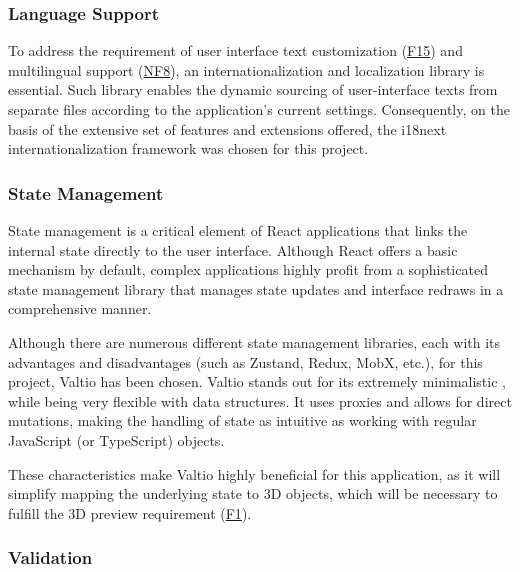 \subsubsection{Language Support} \label{section:i18n}

To address the requirement of user interface text customization (\hyperref[itm:F15]{F15}) and multilingual support (\hyperref[itm:NF8]{NF8}), an internationalization and localization library is essential. Such library enables the dynamic sourcing of user-interface texts from separate files according to the application's current settings. Consequently, on the basis of the extensive set of features and extensions offered, the i18next internationalization framework was chosen for this project.~\cite{Krukowski2023}

\subsubsection{State Management}

State management is a critical element of React applications that links the internal state directly to the user interface. Although React offers a basic mechanism by default, complex applications highly profit from a sophisticated state management library that manages state updates and interface redraws in a comprehensive manner.~\cite{Ceddia2021}

Although there are numerous different state management libraries, each with its advantages and disadvantages (such as Zustand, Redux, MobX, etc.), for this project, Valtio has been chosen. Valtio stands out for its extremely minimalistic , while being very flexible with data structures. It uses proxies and allows for direct mutations, making the handling of state as intuitive as working with regular JavaScript (or TypeScript) objects.~\cite{Adepoju2023}

These characteristics make Valtio highly beneficial for this application, as it will simplify mapping the underlying state to 3D objects, which will be necessary to fulfill the 3D preview requirement (\hyperref[itm:F1]{F1}).

\subsubsection{Validation} \label{section:zod}

